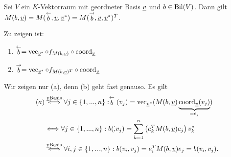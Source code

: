 \documentclass[../../main.tex]{subfiles}
\begin{document}
\begin{pro}\label{13.3.8}
Sei $V$ ein $K$-Vektorraum mit geordneter Basis ${\underline v}$ und $b\in \operatorname{Bil}(V)$. Dann gilt $M(b,{\underline v})=M(\stackrel{\leftarrow}{b}, {\underline v},{\underline v}^*)=M(\stackrel{\rightarrow}{b},{\underline v},{\underline v}^*)^T$.
\end{pro}
\begin{cproof} Zu zeigen ist:
\begin{enumerate}[\normalfont (a)]
\item $\stackrel{\leftarrow}{b}=\operatorname{vec}_{{\underline v}^*}\circ f_{M(b,{\underline v})}\circ \operatorname{coord}_{\underline v}$
\item $\stackrel{\rightarrow}{b}=\operatorname{vec}_{{\underline v}^*}\circ f_{M(b,{\underline v})^T}\circ \operatorname{coord}_{\underline v}$
\end{enumerate}
Wir zeigen nur (a), denn (b) geht fast genauso. Es gilt
\begin{align*}
(a)&\stackrel{{\underline v}\text{Basis}}{\Longleftrightarrow}\forall j\in\{1,...,n\}: \stackrel{\leftarrow}{b}(v_j)=\operatorname{vec}_{{\underline v}^*}(M(b,{\underline v})\underbrace{\operatorname{coord}_{\underline v}(v_j)}_{=e_j})\\
&\Longleftrightarrow \forall j\in\{1,...,n\}: b(\dot, v_j)=\sum_{k=1}^n\left(e_k^TM(b,{\underline v})e_j\right)v_k^*\\
&\stackrel{{\underline v}\text{Basis}}{\Longleftrightarrow}\forall i,j\in\{1,...,n\}: b(v_i,v_j)=e_i^TM(b,{\underline v})e_j=b(v_i,v_j).
\end{align*}
\end{cproof}
\end{document}
